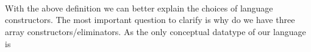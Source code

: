 \begin{code}
\>[2]\AgdaSpace{}%
\AgdaSpace{}%
\AgdaSpace{}%
\AgdaSpace{}%
\AgdaSpace{}%
%
\>[25]\AgdaSpace{}%
\AgdaSpace{}%
\AgdaSpace{}%
%
\>[34]\AgdaSymbol{=}\AgdaSpace{}%
\AgdaSpace{}%
\AgdaSpace{}%
\AgdaSpace{}%
\AgdaSpace{}%
\AgdaSpace{}%
\AgdaSpace{}%
\AgdaSpace{}%
\AgdaSpace{}%
\AgdaSpace{}%
\<%
\\
%
\>[2]\AgdaSpace{}%
\AgdaSpace{}%
\AgdaSpace{}%
%
\>[25]\AgdaSpace{}%
\AgdaSpace{}%
\AgdaSpace{}%
%
\>[34]\AgdaSymbol{=}\AgdaSpace{}%
\AgdaSpace{}%
\AgdaSymbol{(}\AgdaSpace{}%
\AgdaSpace{}%
\AgdaSymbol{)}\AgdaSpace{}%
\AgdaSpace{}%
\AgdaSpace{}%
\<%
\\
%
\>[2]\AgdaSpace{}%
\AgdaSpace{}%
%
\>[25]\AgdaSpace{}%
\AgdaSpace{}%
\AgdaSpace{}%
%
\>[34]\AgdaSymbol{=}\AgdaSpace{}%
\AgdaSpace{}%
\AgdaSymbol{(}\AgdaOperator{\AgdaPrimitive{-\AgdaUnderscore{}}}\AgdaSymbol{)}\AgdaSpace{}%
\AgdaSpace{}%
\AgdaSpace{}%
\<%
\\
%
\>[2]\AgdaSpace{}%
\AgdaSpace{}%
%
\>[25]\AgdaSpace{}%
\AgdaSpace{}%
\AgdaSpace{}%
%
\>[34]\AgdaSymbol{=}\AgdaSpace{}%
\AgdaSpace{}%
\AgdaSpace{}%
\AgdaSpace{}%
\<%
\end{code}
With the above definition we can better explain the choices of language constructors.
The most important question to clarify is why do we have three array
constructors/eliminators.  As the only conceptual datatype of our language is
